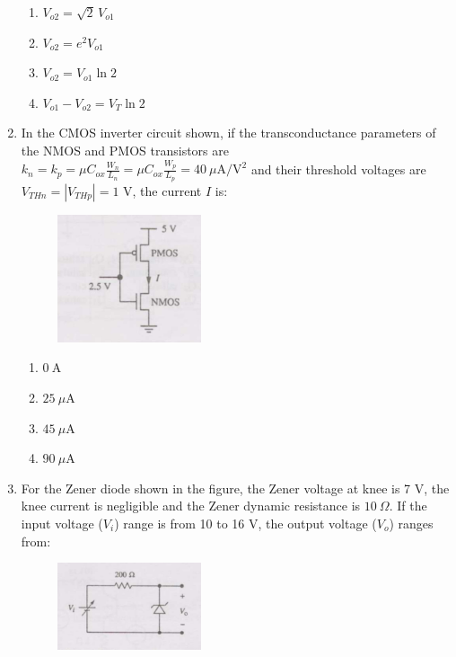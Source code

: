 \documentclass[journal,12pt,onecolumn]{IEEEtran}
\theoremstyle{remark}
\begin{document}
\begin{enumerate}
\hfill{}
\begin{enumerate}
  \item $V_{o2} = \sqrt{2}\,V_{o1}$
  \item $V_{o2} = e^2 V_{o1}$
  \item $V_{o2} = V_{o1} \ln 2$
  \item $V_{o1} - V_{o2} = V_T \ln 2$
\end{enumerate}

\item In the CMOS inverter circuit shown, if the transconductance parameters of the NMOS and PMOS transistors are $k_n = k_p = \mu C_{ox}\frac{W_n}{L_n} = \mu C_{ox}\frac{W_p}{L_p} = 40~\mu\text{A}/\text{V}^2$ and their threshold voltages are $V_{THn} = |V_{THp}| = 1\text{ V}$, the current $I$ is: 

\begin{figure}[ht!]
    \centering
    \includegraphics[width=0.4\textwidth]{Q39.jpg}
    \caption{}
    \label{fig:Q39.jpg}
\end{figure}

\hfill{}

\begin{multicols}{4}
\begin{enumerate}[label=(\Alph*)]
  \item $0~\text{A}$
  \item $25~\mu\text{A}$
  \item $45~\mu\text{A}$
  \item $90~\mu\text{A}$
\end{enumerate}
\end{multicols}

\item For the Zener diode shown in the figure, the Zener voltage at knee is 7 V, the knee current is negligible and the Zener dynamic resistance is $10~\Omega$. If the input voltage ($V_i$) range is from 10 to 16 V, the output voltage ($V_o$) ranges from: 

\begin{figure}[ht!]
    \centering
    \includegraphics[width=0.4\textwidth]{Q40.jpg}
    \caption{}
    \label{fig:Q40.jpg}
\end{figure}


\end{enumerate}
\end{document}
